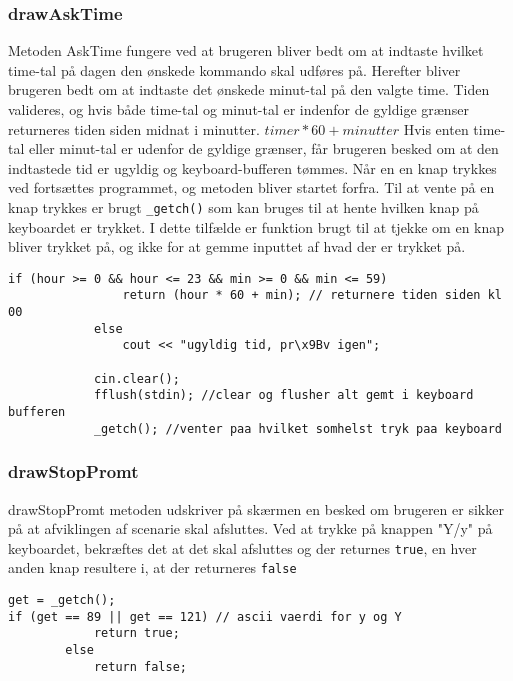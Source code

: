 \subsubsection{drawAskTime}
Metoden AskTime fungere ved at brugeren bliver bedt om at indtaste hvilket time-tal på dagen den ønskede kommando skal udføres på. Herefter bliver brugeren bedt om at indtaste det ønskede minut-tal på den valgte time. Tiden valideres, og hvis både time-tal og minut-tal er indenfor de gyldige grænser returneres tiden siden midnat i minutter. $timer*60+minutter$ 
Hvis enten time-tal eller minut-tal er udenfor de gyldige grænser, får brugeren besked om at den indtastede tid er ugyldig og keyboard-bufferen tømmes. Når en en knap trykkes ved fortsættes programmet, og metoden bliver startet forfra. Til at vente på en knap trykkes er brugt \texttt{\_getch()} som kan bruges til at hente hvilken knap på keyboardet er trykket. I dette tilfælde er funktion brugt til at tjekke om en knap bliver trykket på, og ikke for at gemme inputtet af hvad der er trykket på.
\begin{lstlisting}
if (hour >= 0 && hour <= 23 && min >= 0 && min <= 59)
				return (hour * 60 + min); // returnere tiden siden kl 00
			else
				cout << "ugyldig tid, pr\x9Bv igen";
			
			cin.clear();
			fflush(stdin); //clear og flusher alt gemt i keyboard bufferen
			_getch(); //venter paa hvilket somhelst tryk paa keyboard
\end{lstlisting}


\subsubsection{drawStopPromt}
drawStopPromt metoden udskriver på skærmen en besked om brugeren er sikker på at afviklingen af scenarie skal afsluttes. Ved at trykke på knappen "Y/y" på keyboardet, bekræftes det at det skal afsluttes og der returnes \texttt{true}, en hver anden knap resultere i, at der returneres \texttt{false}
\begin{lstlisting}
get = _getch();
if (get == 89 || get == 121) // ascii vaerdi for y og Y
			return true;
		else
			return false;
\end{lstlisting}

\clearpage